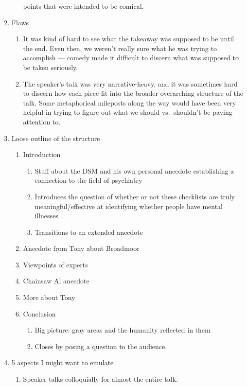 \documentclass{fkpset}
\begin{document}
\begin{solution}[Answers.]
\begin{enumerate}[label=\arabic*.]
\begin{enumerate}
          points that were intended to be comical.
      \end{enumerate}
    \item Flaws
      \begin{enumerate}
        \item It was kind of hard to see what the takeaway was supposed to be
          until the end. Even then, we weren't really sure what he was trying to
          accomplish --- comedy made it difficult to discern what was supposed
          to be taken seriously.
        \item The speaker's talk was very narrative-heavy, and it was sometimes
          hard to discern how each piece fit into the broader overarching
          structure of the talk. Some metaphorical mileposts along the way would
          have been very helpful in trying to figure out what we should vs.\
          shouldn't be paying attention to.
      \end{enumerate}
    \item Loose outline of the structure
      \begin{enumerate}
        \item Introduction
          \begin{enumerate}[label=\roman*.]
            \item Stuff about the DSM and his own personal anecdote establishing
              a connection to the field of psychiatry
            \item Introduces the question of whether or not these checklists are
              truly meaningful/effective at identifying whether people have
              mental illnesses
            \item Transitions to an extended anecdote
          \end{enumerate}
        \item Anecdote from Tony about Broadmoor
        \item Viewpoints of experts
        \item Chainsaw Al anecdote
        \item More about Tony
        \item Conclusion
          \begin{enumerate}[label=\roman*.]
            \item Big picture: gray areas and the humanity reflected in them
            \item Closes by posing a question to the audience.
          \end{enumerate}
      \end{enumerate}
    \item 5 aspects I might want to emulate
      \begin{enumerate}[label=\roman*.]
        \item Speaker talks colloquially for almost the entire talk.
      \end{enumerate}
  \end{enumerate}
\end{solution}
\end{document}
